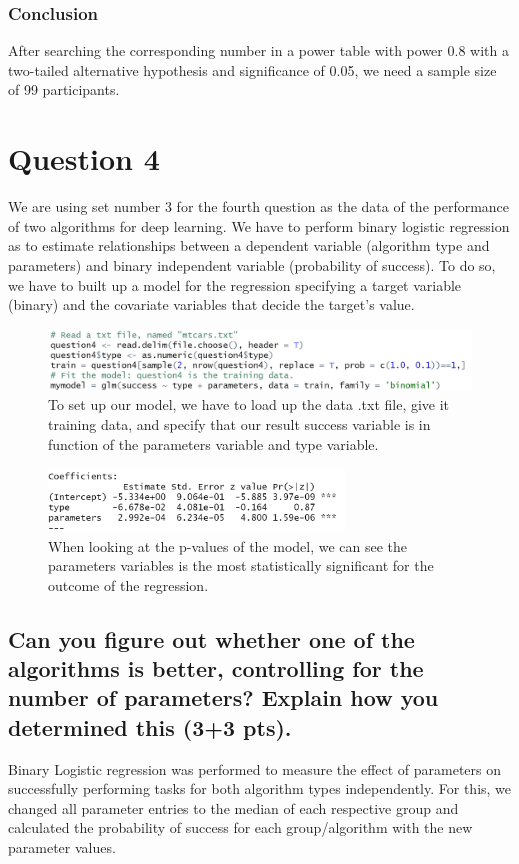 \documentclass[14]{article}
\begin{document}
\subsubsection{Conclusion}
After searching the corresponding number in a power table with power 0.8 with a two-tailed alternative hypothesis and significance of 0.05, we need a sample size of 99 participants.


\section{Question 4}
We are using set number 3 for the fourth question as the data of the performance of two algorithms for deep learning. We have to perform binary logistic regression as to estimate relationships between a dependent variable (algorithm type and parameters) and binary independent variable (probability of success). To do so, we have to built up a model for the regression specifying a target variable (binary) and the covariate variables that decide the target's value.

\begin{figure}[!htb]
	\includegraphics[width=1.0\textwidth]{img/question4/question4_model_code.PNG}
	\captionsetup{width=1.0\textwidth}
	\centering 
	\caption{To set up our model, we have to load up the data .txt file, give it training data, and specify that our result success variable is in function of the parameters variable and type variable. }
\end{figure}

\begin{figure}[!htb]
	\includegraphics[width=0.7\textwidth]{img/question4/question4_model_coef.PNG}
	\captionsetup{width=1.0\textwidth}
	\centering 
	\caption{When looking at the p-values of the model, we can see the parameters variables is the most statistically significant for the outcome of the regression. }
\end{figure}

\subsection{Can you figure out whether one of the algorithms is better, controlling for the number of parameters? Explain how you determined this (3+3 pts).}
Binary Logistic regression was performed to measure the effect of parameters on successfully performing tasks for both algorithm types independently. For this, we changed all parameter entries to the median of each respective group and calculated the probability of success for each group/algorithm with the new parameter values.
\end{document}
